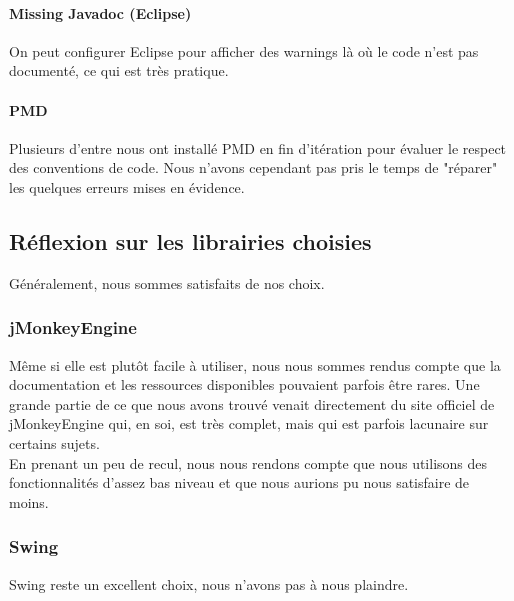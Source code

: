 	\paragraph{Missing Javadoc (Eclipse)}
	On peut configurer Eclipse pour afficher des warnings là où le code n'est
	pas documenté, ce qui est très pratique.

	\paragraph{PMD}
	Plusieurs d'entre nous ont installé PMD en fin d'itération pour évaluer le
	respect des conventions de code. Nous n'avons cependant pas pris le temps
	de "réparer" les quelques erreurs mises en évidence.

\subsection{Réflexion sur les librairies choisies}

	Généralement, nous sommes satisfaits de nos choix.

	\subsubsection{jMonkeyEngine}
	Même si elle est plutôt facile à utiliser, nous nous sommes rendus compte
	que la documentation et les ressources disponibles pouvaient parfois être
	rares. Une grande partie de ce que nous avons trouvé venait directement 
	du site officiel de jMonkeyEngine qui, en soi, est très complet, mais qui
	est parfois lacunaire sur certains sujets.\\

	En prenant un peu de recul, nous nous rendons compte que nous utilisons
	des fonctionnalités d'assez bas niveau et que nous aurions pu nous 
	satisfaire de moins.

	\subsubsection{Swing}
	Swing reste un excellent choix, nous n'avons pas à nous plaindre.

